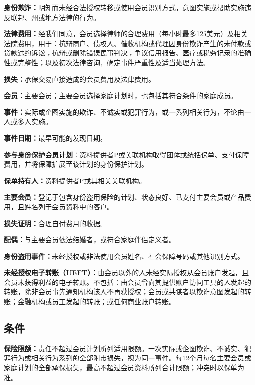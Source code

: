 \documentclass[UTF8,fontset=none,11pt,a4paper]{ctexart}
\begin{document}
\textbf{身份欺诈：}明知而未经合法授权转移或使用会员识别方式，意图实施或帮助实施违反联邦、州或地方法\allowbreak\mbox{律的行为。}


\textbf{法律费用：}经我们同意，会员选择律师的合理费用（每小时最多125美元）及相关法院费用，用于：抗辩商户、债权人、催收机构或代理因身份欺诈产生的未付款或贷款违约诉讼；抗辩或删除错误民事判决；争议信用报告、医疗或税务记录的准确性或完整性；以及初次法律咨询，确定事件严重性及适当\allowbreak\mbox{处理方法。}


\textbf{损失：}承保交易直接造成的会员费用及\allowbreak\mbox{法律费用。}


\textbf{会员：}主要会员；主要会员选择家庭计划时，也包括其符合条件的\allowbreak\mbox{家庭成员。}


\textbf{事件：}实际或企图实施的欺诈、不诚实或犯罪行为，或一系列相关行为，不论由一人或\allowbreak\mbox{多人实施。}


\textbf{事件日期：}最早可能的\allowbreak\mbox{发现日期。}


\textbf{参与身份保护会员计划：}资料提供者P或关联机构取得团体或统括保单、支付保障费用，并将保障扩展至该计划的身份\allowbreak\mbox{保护计划。}


\textbf{保单持有人：}资料提供者P或其相关\allowbreak\mbox{关联机构。}


\textbf{主要会员：}登记于包含身份盗用保险的计划、状态良好、已支付主要会员或产品费用，且姓名列于会员资料\allowbreak\mbox{中的客户。}


\textbf{损失证明：}合理自付费\allowbreak\mbox{用的收据。}


\textbf{配偶：}与主要会员依法结婚者，或符合家庭伴\allowbreak\mbox{侣定义者。}


\textbf{身份盗用事件：}未经授权或非法使用会员姓名、社会保障号码或其他\allowbreak\mbox{识别方式。}


\textbf{未经授权电子转账（UEFT）：}由会员以外的人未经实际授权从会员账户发起，且会员未获得利益的电子转账。不包括：由会员曾向其提供账户访问工具的人发起的转账，除非会员事先通知机构该人不再获授权；会员或共谋者以欺诈意图发起的转账；金融机构或员工发起的转账；或任何商业账\allowbreak\mbox{户转账。}


\subsection*{条件}
\textbf{保险限额：}责任不超过会员计划所列适用限额。一次实际或企图欺诈、不诚实、犯罪行为或相关行为系列的全部附带损失，视为同一事件。每12个月每名主要会员或家庭计划的全部承保损失，最高不超过会员资料所列合计限额；冲突时以\allowbreak\mbox{保单为准。}
\end{document}
